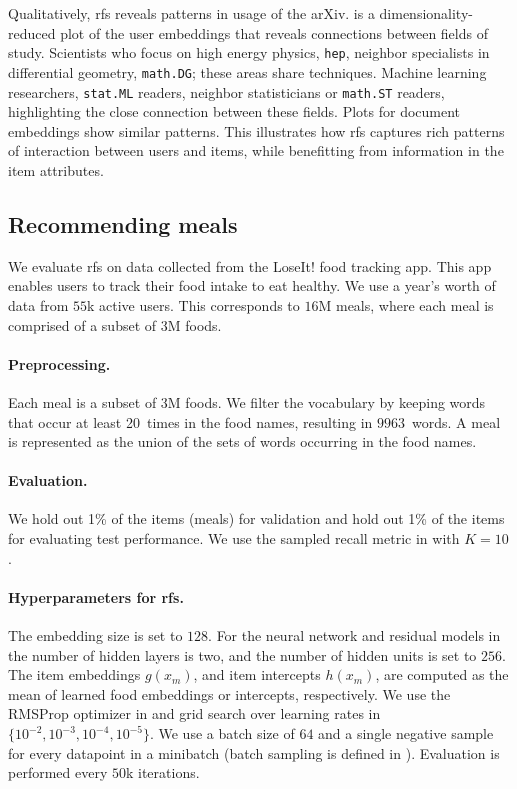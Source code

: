 Qualitatively, \gls{rfs} reveals patterns in usage of the arXiv.
 is a dimensionality-reduced plot of the user embeddings
that reveals connections between fields of study. Scientists who focus on high
energy physics, \texttt{hep}, neighbor specialists in differential geometry,
\texttt{math.DG}; these areas share techniques. Machine learning researchers,
\texttt{stat.ML} readers, neighbor statisticians or \texttt{math.ST} readers,
highlighting the close connection between these fields. Plots for document
embeddings show similar patterns. This illustrates how \gls{rfs}
captures rich patterns of interaction between users and items, while benefitting
from information in the item attributes.

\subsection{Recommending meals}
\label{sec:experiments_meals}

We evaluate \gls{rfs} on data collected from the LoseIt! food tracking app. This
app enables users to track their food intake to eat healthy. We use a year's
worth of data from $55$k active users. This corresponds to $16$M meals, where
each meal is comprised of a subset of $3$M foods.

\paragraph{Preprocessing.} Each meal is a subset of $3$M foods. We filter the
vocabulary by keeping words that occur at least 20~times in the food names,
resulting in $9963$~words. A meal is represented as the union of the sets of
words occurring in the food names.

\paragraph{Evaluation.} We hold out 1\% of the items (meals) for validation and
hold out 1\% of the items for evaluating test performance. We use the sampled
recall metric in  with $K=10$.




\paragraph{Hyperparameters for \gls{rfs}.} The embedding size is set to $128$.
For the neural network and residual models in
 the number of hidden layers is two, and
the number of hidden units is set to $256$. The item embeddings $g(x_m)$, and
item intercepts $h(x_m)$, are computed as the mean of learned food embeddings or
intercepts, respectively. We use the RMSProp optimizer in
\citet{graves2013generating} and grid search over learning rates in
$\{10^{-2}, 10^{-3}, 10^{-4}, 10^{-5}\}$. We use a batch size of $64$ and a
single negative sample for every datapoint in a minibatch (batch sampling is
defined in ). Evaluation is
performed every $50$k iterations.


